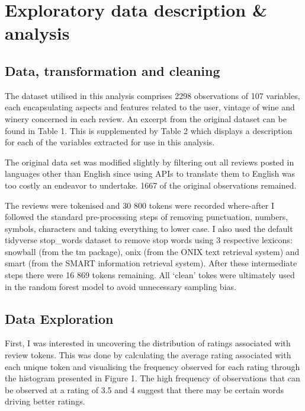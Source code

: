 \documentclass[11pt,preprint]{elsarticle}
\numberwithin{equation}{section}
\numberwithin{figure}{section}
\numberwithin{table}{section}
\begin{document}
\newpage

\section{\texorpdfstring{Exploratory data description \& analysis
\label{Data}}{Exploratory data description \& analysis }}\label{exploratory-data-description-analysis}

\subsection{Data, transformation and
cleaning}\label{data-transformation-and-cleaning}

The dataset utilised in this analysis comprises 2298 observations of 107
variables, each encapsulating aspects and features related to the user,
vintage of wine and winery concerned in each review. An excerpt from the
original dataset can be found in Table 1. This is supplemented by Table
2 which displays a description for each of the variables extracted for
use in this analysis.

The original data set was modified slightly by filtering out all reviews
posted in languages other than English since using APIs to translate
them to English was too costly an endeavor to undertake. 1667 of the
original observations remained.

The reviews were tokenised and 30 800 tokens were recorded where-after I
followed the standard pre-processing steps of removing punctuation,
numbers, symbols, characters and taking everything to lower case. I also
used the default tidyverse stop\_words dataset to remove stop words
using 3 respective lexicons: snowball (from the tm package), onix (from
the ONIX text retrieval system) and smart (from the SMART information
retrieval system). After these intermediate steps there were 16 869
tokens remaining. All `clean' tokes were ultimately used in the random
forest model to avoid unnecessary sampling bias.

\subsection{Data Exploration}\label{data-exploration}

First, I was interested in uncovering the distribution of ratings
associated with review tokens. This was done by calculating the average
rating associated with each unique token and visualising the frequency
observed for each rating through the histogram presented in Figure 1.
The high frequency of observations that can be observed at a rating of
3.5 and 4 suggest that there may be certain words driving better
ratings.
\end{document}
